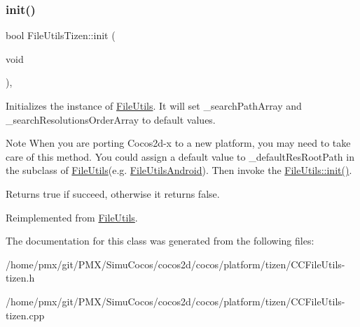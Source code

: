 \subsubsection{\texorpdfstring{init()}{init()}}
{\footnotesize\ttfamily bool File\+Utils\+Tizen\+::init (\begin{DoxyParamCaption}\item[{void}]{ }\end{DoxyParamCaption})\hspace{0.3cm}{\ttfamily [override]}, {\ttfamily [virtual]}}

Initializes the instance of \hyperlink{classFileUtils}{File\+Utils}. It will set \+\_\+search\+Path\+Array and \+\_\+search\+Resolutions\+Order\+Array to default values.

\begin{DoxyNote}{Note}
When you are porting Cocos2d-\/x to a new platform, you may need to take care of this method. You could assign a default value to \+\_\+default\+Res\+Root\+Path in the subclass of \hyperlink{classFileUtils}{File\+Utils}(e.\+g. \hyperlink{classFileUtilsAndroid}{File\+Utils\+Android}). Then invoke the \hyperlink{classFileUtils_a2c891e99dc7af7343f4f9e8d4798a563}{File\+Utils\+::init()}. 
\end{DoxyNote}
\begin{DoxyReturn}{Returns}
true if succeed, otherwise it returns false. 
\end{DoxyReturn}


Reimplemented from \hyperlink{classFileUtils_a2c891e99dc7af7343f4f9e8d4798a563}{File\+Utils}.



The documentation for this class was generated from the following files\+:\begin{DoxyCompactItemize}
\item 
/home/pmx/git/\+P\+M\+X/\+Simu\+Cocos/cocos2d/cocos/platform/tizen/C\+C\+File\+Utils-\/tizen.\+h\item 
/home/pmx/git/\+P\+M\+X/\+Simu\+Cocos/cocos2d/cocos/platform/tizen/C\+C\+File\+Utils-\/tizen.\+cpp\end{DoxyCompactItemize}
